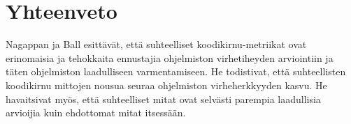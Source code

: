\documentclass[finnish]{../tktltiki2}
\theoremstyle{definition}
\theoremstyle{remark}
\begin{document}
\section{Yhteenveto}

Nagappan ja Ball esittävät, että suhteelliset koodikirnu-metriikat ovat erinomaisia ja tehokkaita ennustajia ohjelmiston virhetiheyden arviointiin ja täten ohjelmiston laadulliseen varmentamiseen. He todistivat, että suhteellisten koodikirnu mittojen nousua seuraa ohjelmiston virheherkkyyden kasvu. He havaitsivat myös, että suhteelliset mitat ovat selvästi parempia laadullisia arvioijia kuin ehdottomat mitat itsessään.




\end{document}
